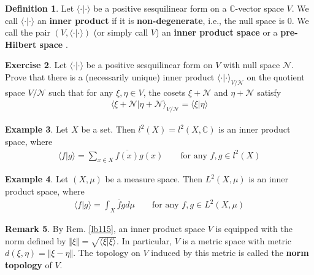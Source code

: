 \documentclass[12pt,b5paper,notitlepage]{article}
\theoremstyle{definition}
\newtheorem{df}{Definition}[subsection]
\newtheorem{eg}[df]{Example}
\newtheorem{exe}[df]{Exercise}
\newtheorem{rem}[df]{Remark}
\theoremstyle{plain}
\newcommand{\ovl}{\overline}
\newcommand{\bk}[1]{\langle {#1}\rangle}
\newcommand{\scr}{\mathscr}
\newcommand{\Cbb}{\mathbb C}
\numberwithin{equation}{section}
\begin{document}
\begin{df}
Let $\bk{\cdot|\cdot}$ be a positive sesquilinear form on a $\Cbb$-vector space $V$. We call $\bk{\cdot|\cdot}$ an \textbf{inner product}  if it is  \textbf{non-degenerate}, i.e., the null space is $0$.  We call the pair $(V,\bk{\cdot|\cdot})$ (or simply call $V$) an \textbf{inner product space} or a \textbf{pre-Hilbert space} .
\end{df}



\begin{exe}\label{lb346}
Let $\bk{\cdot|\cdot}$ be a positive sesquilinear form on $V$ with null space $\scr N$. Prove that there is a (necessarily unique) inner product $\bk{\cdot|\cdot}_{V/\scr N}$ on the quotient space $V/\scr N$ such that for any $\xi,\eta\in V$, the cosets $\xi+\scr N$ and $\eta+\scr N$ satisfy
\begin{align*}
\bk{\xi+\scr N|\eta+\scr N }_{V/\scr N}=\bk{\xi|\eta}
\end{align*}
\end{exe}


\begin{eg}
Let $X$ be a set. Then $l^2(X)=l^2(X,\Cbb)$ is an inner product space, where
\begin{align*}
\bk{f|g}=\sum_{x\in X} \ovl{f(x)}g(x)\qquad\text{for any }f,g\in l^2(X)
\end{align*} 
\end{eg}


\begin{eg}
Let $(X,\mu)$ be a measure space. Then $L^2(X,\mu)$ is an inner product space, where
\begin{align*}
\bk{f|g}=\int_X \ovl fgd\mu\qquad\text{for any }f,g\in L^2(X,\mu)
\end{align*}
\end{eg}


\begin{rem}
By Rem. \ref{lb115}, an inner product space $V$ is equipped with the norm defined by $\Vert \xi\Vert=\sqrt{\bk{\xi|\xi}}$. In particular, $V$ is a metric space with metric $d(\xi,\eta)=\Vert \xi-\eta\Vert$. The topology on $V$ induced by this metric is called the \textbf{norm topology}  of $V$. 
\end{rem}
\end{document}
